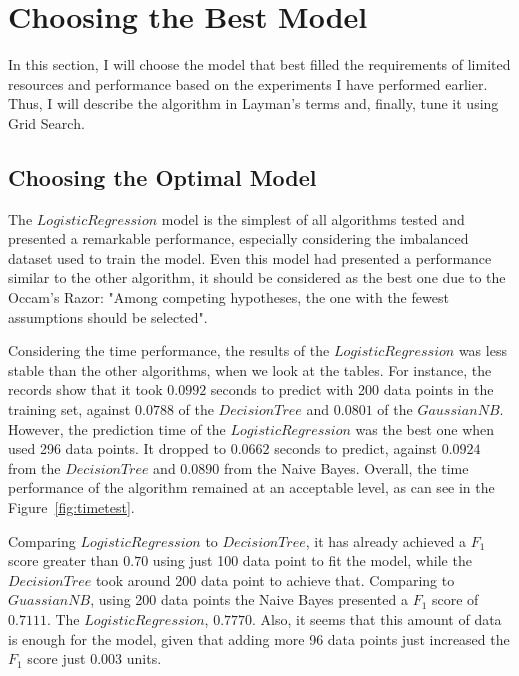 \documentclass[a4paper]{article}
\begin{document}

\section{Choosing the Best Model}
In this section, I will choose the model that best filled the requirements of limited resources and performance based on the experiments I have performed earlier. Thus, I will describe the algorithm in Layman's terms and, finally, tune it using Grid Search.

\subsection{Choosing the Optimal Model}
The $Logistic Regression$ model is the simplest of all algorithms tested and presented a remarkable performance, especially considering the imbalanced dataset used to train the model. Even this model had presented a performance similar to the other algorithm, it should be considered as the best one due to the Occam's Razor: "Among competing hypotheses, the one with the fewest assumptions should be selected".

Considering the time performance, the results of the $Logistic Regression$ was less stable than the other algorithms, when we look at the tables. For instance, the records show that it took $0.0992$ seconds to predict with 200 data points in the training set, against $0.0788$ of the $Decision Tree$ and $0.0801$ of the $GaussianNB$. However, the prediction time of the $Logistic Regression$ was the best one when used 296 data points. It dropped to $0.0662$ seconds to predict, against $0.0924$ from the $Decision Tree$ and $0.0890$ from the Naive Bayes. Overall, the time performance of the algorithm remained at an acceptable level, as can see in the Figure~\ref{fig:timetest}.

Comparing $Logistic Regression$ to $Decision Tree$, it has already achieved a $F_1$ score greater than $0.70$ using just 100 data point to fit the model, while the $Decision Tree$ took around 200 data point to achieve that. Comparing to $GuassianNB$, using 200 data points the Naive Bayes presented a $F_1$ score of $0.7111$. The $Logistic Regression$, $0.7770$. Also, it seems that this amount of data is enough for the model, given that adding more 96 data points just increased the $F_1$ score just $0.003$ units. 
\end{document}
